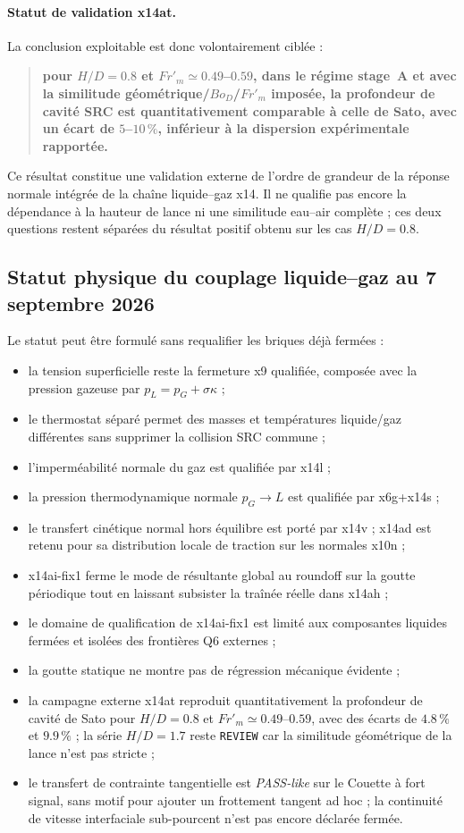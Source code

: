\documentclass[11pt,a4paper]{article}
\begin{document}
\paragraph{Statut de validation x14at.}
La conclusion exploitable est donc volontairement ciblée :
\begin{quote}
\textbf{pour $H/D=0.8$ et $Fr'_m\simeq0.49$--$0.59$, dans le régime stage~A et avec la similitude géométrique/$Bo_D$/$Fr'_m$ imposée, la profondeur de cavité SRC est quantitativement comparable à celle de Sato, avec un écart de $5$--$10\,\%$, inférieur à la dispersion expérimentale rapportée.}
\end{quote}
Ce résultat constitue une validation externe de l'ordre de grandeur de la réponse normale intégrée de la chaîne liquide--gaz x14. Il ne qualifie pas encore la dépendance à la hauteur de lance ni une similitude eau--air complète ; ces deux questions restent séparées du résultat positif obtenu sur les cas $H/D=0.8$.

\subsection{Statut physique du couplage liquide--gaz au 7 septembre 2026}

Le statut peut être formulé sans requalifier les briques déjà fermées :
\begin{itemize}
  \item la tension superficielle reste la fermeture x9 qualifiée, composée avec la pression gazeuse par $p_L=p_G+\sigma\kappa$ ;
  \item le thermostat séparé permet des masses et températures liquide/gaz différentes sans supprimer la collision SRC commune ;
  \item l'imperméabilité normale du gaz est qualifiée par x14l ;
  \item la pression thermodynamique normale $p_G\rightarrow L$ est qualifiée par x6g+x14s ;
  \item le transfert cinétique normal hors équilibre est porté par x14v ; x14ad est retenu pour sa distribution locale de traction sur les normales x10n ;
  \item x14ai-fix1 ferme le mode de résultante global au roundoff sur la goutte périodique tout en laissant subsister la traînée réelle dans x14ah ;
  \item le domaine de qualification de x14ai-fix1 est limité aux composantes liquides fermées et isolées des frontières Q6 externes ;
  \item la goutte statique ne montre pas de régression mécanique évidente ;
  \item la campagne externe x14at reproduit quantitativement la profondeur de cavité de Sato pour $H/D=0.8$ et $Fr'_m\simeq0.49$--$0.59$, avec des écarts de $4.8\,\%$ et $9.9\,\%$ ; la série $H/D=1.7$ reste \texttt{REVIEW} car la similitude géométrique de la lance n'est pas stricte ;
  \item le transfert de contrainte tangentielle est \emph{PASS-like} sur le Couette à fort signal, sans motif pour ajouter un frottement tangent ad hoc ; la continuité de vitesse interfaciale sub-pourcent n'est pas encore déclarée fermée.
\end{itemize}
\end{document}
